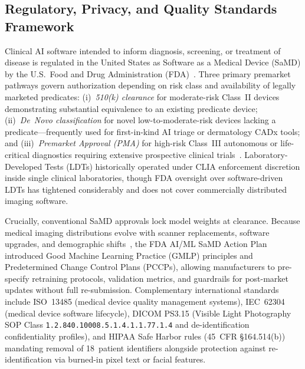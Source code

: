 \subsection{Regulatory, Privacy, and Quality Standards Framework}
Clinical AI software intended to inform diagnosis, screening, or treatment of disease is regulated in the United States as Software as a Medical Device (SaMD) by the U.S.\ Food and Drug Administration (FDA)~\cite{Food2021artificial,Gerke2020need}. Three primary premarket pathways govern authorization depending on risk class and availability of legally marketed predicates: (i)~\emph{510(k) clearance} for moderate-risk Class~II devices demonstrating substantial equivalence to an existing predicate device; (ii)~\emph{De~Novo classification} for novel low-to-moderate-risk devices lacking a predicate—frequently used for first-in-kind AI triage or dermatology CADx tools; and (iii)~\emph{Premarket Approval (PMA)} for high-risk Class~III autonomous or life-critical diagnostics requiring extensive prospective clinical trials~\cite{Zhu2022landscape}. Laboratory-Developed Tests (LDTs) historically operated under CLIA enforcement discretion inside single clinical laboratories, though FDA oversight over software-driven LDTs has tightened considerably and does not cover commercially distributed imaging software.

Crucially, conventional SaMD approvals lock model weights at clearance. Because medical imaging distributions evolve with scanner replacements, software upgrades, and demographic shifts~\cite{Finlayson2021clinician}, the FDA AI/ML SaMD Action Plan~\cite{Food2021artificial} introduced Good Machine Learning Practice (GMLP) principles and Predetermined Change Control Plans (PCCPs), allowing manufacturers to pre-specify retraining protocols, validation metrics, and guardrails for post-market updates without full re-submission. Complementary international standards include ISO~13485 (medical device quality management systems), IEC~62304 (medical device software lifecycle), DICOM PS3.15 (Visible Light Photography SOP Class \texttt{1.2.840.10008.5.1.4.1.1.77.1.4} and de-identification confidentiality profiles), and HIPAA Safe Harbor rules (45~CFR \S164.514(b)) mandating removal of 18~patient identifiers alongside protection against re-identification via burned-in pixel text or facial features.
